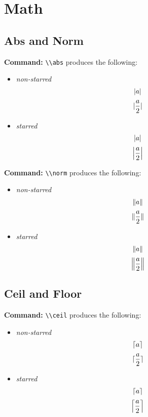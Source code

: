 \documentclass[10pt]{article}
\newcommand{\commandcmd}[1]{\par\noindent\textbf{Command:} \lstinline{\\#1}}
\begin{document}
\begin{exercise}[title=Übung]
  \lipsum[1-1]
  \begin{solution}
    \lipsum[1-1]
  \end{solution}
\end{exercise}

\begin{exercise}
  \renewcommand{\thesolutioncounter}{(\roman{solutioncounter})}%
  \lipsum[1-1]
  \begin{solution}
  \end{solution}
  \begin{solution}
  \end{solution}
\end{exercise}

\section{Math}
\subsection{Abs and Norm}
\commandcmd{abs} produces the following:
\begin{itemize}
  \item \emph{non-starred}
        \[\abs{a}\]
        \[\abs{\frac{a}{2}}\]
  \item \emph{starred}
        \[\abs*{a}\]
        \[\abs*{\frac{a}{2}}\]
\end{itemize}

\commandcmd{norm} produces the following:
\begin{itemize}
  \item \emph{non-starred}
        \[\norm{a}\]
        \[\norm{\frac{a}{2}}\]
  \item \emph{starred}
        \[\norm*{a}\]
        \[\norm*{\frac{a}{2}}\]
\end{itemize}

\subsection{Ceil and Floor}
\commandcmd{ceil} produces the following:
\begin{itemize}
  \item \emph{non-starred}
        \[\ceil{a}\]
        \[\ceil{\frac{a}{2}}\]
  \item \emph{starred}
        \[\ceil*{a}\]
        \[\ceil*{\frac{a}{2}}\]
\end{itemize}
\end{document}
